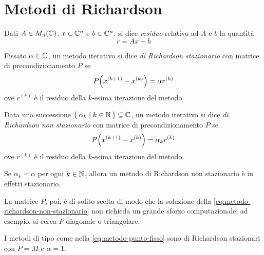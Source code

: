 \section{Metodi di Richardson}
	
	\begin{definizione}[Residuo]\label{def:residuo}
		Dati \(A \in M_n (\mathbb{C})\), \(x \in \mathbb{C}^n\) e \(b \in \mathbb{C}^n\), si dice \emph{residuo} relativo ad \(A\) e \(b\) la quantità
		\begin{equation}\label{eq:residuo}
			r = A x - b
		\end{equation}
	\end{definizione}

	\begin{definizione}\label{def:metodo-richardson-stazionario}
		Fissato \(\alpha \in \mathbb{C}\), un metodo iterativo si dice \emph{di Richardson stazionario} con matrice di precondizionamento \(P\) se
		\begin{equation}\label{eq:metodo-richardson-stazionario}
			P \qty(x^{(k + 1)} - x^{(k)}) = \alpha r^{(k)}
		\end{equation}
		ove \(r^{(k)}\) è il residuo della \(k\)-esima iterazione del metodo.
	\end{definizione}
	
	\begin{definizione}\label{def:metodo-richardson-non-stazionario}
		Data una successione \(\Set{\alpha_k | k \in \mathbb{N}} \subseteq \mathbb{C}\), un metodo iterativo si dice \emph{di Richardson non stazionario} con matrice di precondizionamento \(P\) se
		\begin{equation}\label{eq:metodo-richardson-non-stazionario}
			P \qty(x^{(k + 1)} - x^{(k)}) = \alpha_k r^{(k)}
		\end{equation}
		ove \(r^{(k)}\) è il residuo della \(k\)-esima iterazione del metodo.
	\end{definizione}

	\begin{osservazione}
		Se \(\alpha_k = \alpha\) per ogni \(k \in \mathbb{N}\), allora un metodo di Richardson non stazionario è in effetti stazionario.
		
		La matrice \(P\), poi, è di solito scelta di modo che la soluzione della \eqref{eq:metodo-richardson-non-stazionario} non richieda un grande sforzo computazionale; ad esempio, si cerca \(P\) diagonale o triangolare.
	\end{osservazione}

	\begin{proposizione}\label{prop:punto-fisso-richardson}
		I metodi di tipo come nella \eqref{eq:metodo-punto-fisso} sono di Richardson stazionari con \(P = M\) e \(\alpha = 1\).
	\end{proposizione}
	
